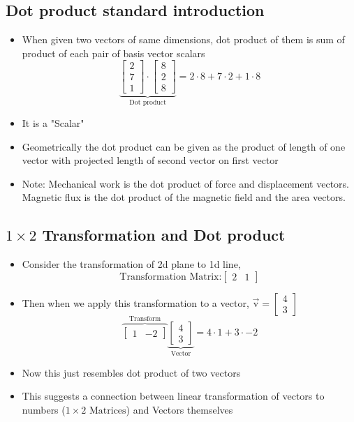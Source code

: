 \documentclass[a4paper]{article}
\begin{document}
\subsection{Dot product standard introduction}
\begin{itemize}
	\item When given two vectors of same dimensions, dot product of them is
	      sum of product of each pair of basis vector scalars
	      \[
		      \underbrace{
			      \begin{bmatrix}
				      2 \\
				      7 \\
				      1\end{bmatrix}
			      \cdot
			      \begin{bmatrix}
				      8 \\
				      2 \\
				      8\end{bmatrix}
		      }_{\text{ Dot product }}
		      = 2 \cdot 8
		      + 7 \cdot 2
		      + 1 \cdot 8
	      \]
	\item It is a "Scalar"
	\item Geometrically the dot product can be given as the product of
	      length of one vector with projected length of second vector
	      on first vector
	\item Note: Mechanical work is the dot product of force and displacement
	      \newline vectors. Magnetic flux is the dot product of
	      the magnetic field and the area vectors.
\end{itemize}

\subsection{$1 \times 2 $ Transformation and Dot product}
\begin{itemize}
	\item Consider the transformation of 2d plane to 1d line,
	      \[
		      \text{Transformation Matrix:}
		      \begin{bmatrix}
			      2 & 1 \end{bmatrix}
	      \]
	\item Then when we apply this transformation to a vector,
	      $ \vec{\text{v}} = \begin{bmatrix} 4 \\ 3 \end{bmatrix} $
	      \[
		      \overbrace{
			      \begin{bmatrix}
				      1 & -2 \end{bmatrix}
		      }^{\text{Transform}}
		      \underbrace{
			      \begin{bmatrix}
				      4 \\ 3 \end{bmatrix}
		      }_{\text{Vector}}
		      = 4 \cdot 1
		      + 3 \cdot -2
	      \]
	\item Now this just resembles dot product of two vectors
	\item This suggests a connection between linear transformation
	      of vectors to numbers ($1 \times 2 \text{ Matrices} $)
	      and Vectors themselves
\end{itemize}
\end{document}

